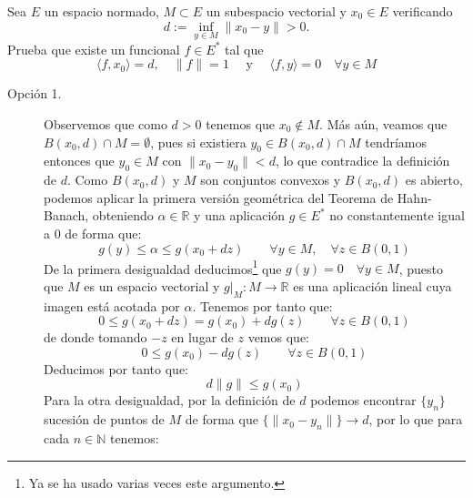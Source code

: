 \documentclass[12pt]{article}
\newcommand{\norma}[1]{\lVert #1 \rVert}
\newcommand{\dual}[1]{#1^{*}}
\newcommand{\prodescalar}[2]{\langle #1, #2 \rangle}
\begin{document}
    \begin{ejercicio}[3.5 Puntos]
        Sea $E$ un espacio normado, $M \subset E$ un subespacio vectorial y $x_0 \in E$ verificando
        $$d:= \inf_{y \in M} \norma{x_0 - y} > 0.$$
        Prueba que existe un funcional $f \in \dual{E}$ tal que 
        $$\prodescalar{f}{x_0} = d, \quad \norma{f} = 1 \quad \text{ y } \quad \prodescalar{f}{y} = 0 \quad \forall y \in M$$

        \noindent
        \begin{description}
            \item [Opción 1.] Observemos que como $d>0$ tenemos que $x_0\notin M$. Más aún, veamos que $B(x_0,d)\cap M = \emptyset $, pues si existiera $y_0\in B(x_0,d)\cap M$ tendríamos entonces que $y_0\in M$ con $\|x_0-y_0\| < d$, lo que contradice la definición de $d$. Como $B(x_0,d)$ y $M$ son conjuntos convexos y $B(x_0,d)$ es abierto, podemos aplicar la primera versión geométrica del Teorema de Hahn-Banach, obteniendo $\alpha\in \mathbb{R}$ y una aplicación $g\in E^\ast$ no constantemente igual a $0$ de forma que:
                \begin{equation*}
                    g(y) \leq \alpha \leq g(x_0 + dz) \qquad \forall y\in M,\quad \forall z\in B(0,1)
                \end{equation*}
                De la primera desigualdad deducimos\footnote{Ya se ha usado varias veces este argumento.} que $g(y) = 0 \quad \forall y\in M$, puesto que $M$ es un espacio vectorial y $g\big|_M:M\to \mathbb{R}$ es una aplicación lineal cuya imagen está acotada por $\alpha$. Tenemos por tanto que:
                \begin{equation*}
                    0 \leq g(x_0 + dz) = g(x_0) + dg(z) \qquad \forall z\in B(0,1)
                \end{equation*}
                de donde tomando $-z$ en lugar de $z$ vemos que:
                \begin{equation*}
                    0 \leq g(x_0) - dg(z) \qquad \forall z\in B(0,1)
                \end{equation*}
                Deducimos por tanto que:
                \begin{equation*}
                    d\|g\| \leq g(x_0)
                \end{equation*}
                Para la otra desigualdad, por la definición de $d$ podemos encontrar $\{y_n\}$ sucesión de puntos de $M$ de forma que $\{\|x_0-y_n\|\}\to d$, por lo que para cada $n\in \mathbb{N}$ tenemos:
                \begin{equation*}

\end{equation*}
\end{description}
\end{ejercicio}
\end{document}
